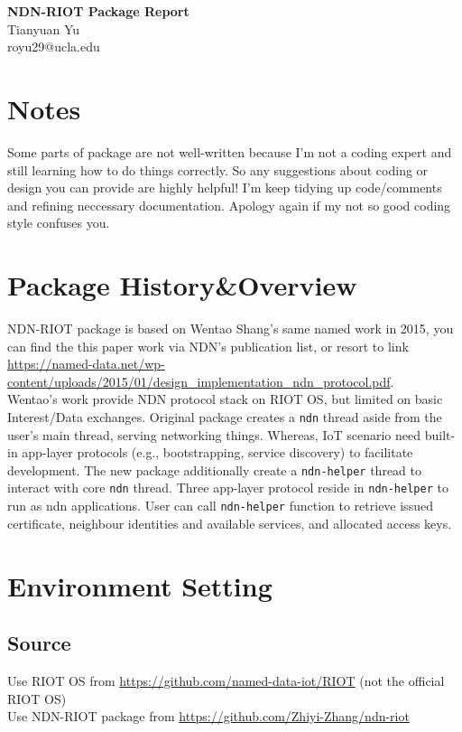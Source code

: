 \documentclass[a4paper, 11pt]{article}
\begin{document}
        \noindent
        \large\textbf{NDN-RIOT Package Report} \\ 
        \normalsize Tianyuan Yu \\ royu29@ucla.edu
        
        \section*{Notes}
        Some parts of package are not well-written because I'm not a coding expert and still learning how to do things correctly. So any suggestions about coding or design you can provide are highly helpful! I'm keep tidying up code/comments and refining neccessary documentation. Apology again if my not so good coding style confuses you.

        \section*{Package History\&Overview}
        NDN-RIOT package is based on Wentao Shang's same named work in 2015, you can find the this paper work via NDN's publication list, or resort to link \url{https://named-data.net/wp-content/uploads/2015/01/design_implementation_ndn_protocol.pdf}.\\ Wentao's work provide NDN protocol stack on RIOT OS, but limited on basic Interest/Data exchanges. Original package creates a \texttt{ndn} thread aside from the user's main thread, serving networking things. Whereas, IoT scenario need built-in app-layer protocols (e.g., bootstrapping, service discovery) to facilitate development. The new package additionally create a \texttt{ndn-helper} thread to interact with core \texttt{ndn} thread. Three app-layer protocol reside in \texttt{ndn-helper} to run as ndn applications. User can call \texttt{ndn-helper} function to retrieve issued certificate, neighbour identities and available services, and allocated access keys.
        
        \section*{Environment Setting}
        \subsection*{Source}
        Use RIOT OS from \url{https://github.com/named-data-iot/RIOT} (not the official RIOT OS)\\
        Use NDN-RIOT package from \url{https://github.com/Zhiyi-Zhang/ndn-riot}
\end{document}
